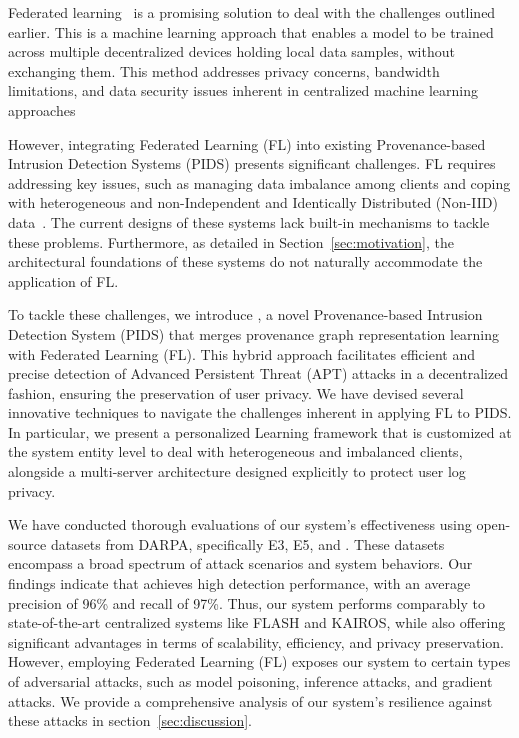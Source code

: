 Federated learning~\cite{mcmahan2017communication} is a promising solution to deal with the challenges outlined earlier. This is a machine learning approach that enables a model to be trained across multiple decentralized devices holding local data samples, without exchanging them. This method addresses privacy concerns, bandwidth limitations, and data security issues inherent in centralized machine learning approaches


However, integrating Federated Learning (FL) into existing Provenance-based Intrusion Detection Systems (PIDS) presents significant challenges. FL requires addressing key issues, such as managing data imbalance among clients and coping with heterogeneous and non-Independent and Identically Distributed (Non-IID) data~\cite{zhao2018federated}. The current designs of these systems lack built-in mechanisms to tackle these problems. Furthermore, as detailed in Section~\ref{sec:motivation}, the architectural foundations of these systems do not naturally accommodate the application of FL.


To tackle these challenges, we introduce \Sys, a novel Provenance-based Intrusion Detection System (PIDS) that merges provenance graph representation learning with Federated Learning (FL). This hybrid approach facilitates efficient and precise detection of Advanced Persistent Threat (APT) attacks in a decentralized fashion, ensuring the preservation of user privacy. We have devised several innovative techniques to navigate the challenges inherent in applying FL to PIDS. In particular, we present a personalized \gnnshort Learning framework that is customized at the system entity level to deal with heterogeneous and imbalanced clients, alongside a multi-server architecture designed explicitly to protect user log privacy.



We have conducted thorough evaluations of our system's effectiveness using open-source datasets from DARPA, specifically E3, E5, and \optc. These datasets encompass a broad spectrum of attack scenarios and system behaviors. Our findings indicate that \Sys achieves high detection performance, with an average precision of 96\% and recall of 97\%. Thus, our system performs comparably to state-of-the-art centralized systems like FLASH and KAIROS, while also offering significant advantages in terms of scalability, efficiency, and privacy preservation. However, employing Federated Learning (FL) exposes our system to certain types of adversarial attacks, such as model poisoning, inference attacks, and gradient attacks. We provide a comprehensive analysis of our system's resilience against these attacks in section~\ref{sec:discussion}.

